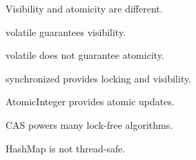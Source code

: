 \documentclass[11pt,a4paper]{book}
\begin{document}
\begin{rosettarule}

Visibility and atomicity are different.

\end{rosettarule}


\begin{rosettarule}

volatile guarantees visibility.

\end{rosettarule}


\begin{rosettarule}

volatile does not guarantee atomicity.

\end{rosettarule}


\begin{rosettarule}

synchronized provides locking and visibility.

\end{rosettarule}


\begin{rosettarule}

AtomicInteger provides atomic updates.

\end{rosettarule}


\begin{rosettarule}

CAS powers many lock-free algorithms.

\end{rosettarule}


\begin{rosettarule}

HashMap is not thread-safe.

\end{rosettarule}

\end{document}
